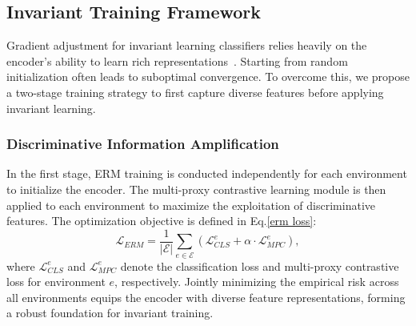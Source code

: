 \subsection{Invariant Training Framework}
\label{invariant training}
Gradient adjustment for invariant learning classifiers relies heavily on the encoder’s ability to learn rich representations~\cite{rich}. Starting from random initialization often leads to suboptimal convergence. To overcome this, we propose a two-stage training strategy to first capture diverse features before applying invariant learning.

\subsubsection{Discriminative Information Amplification}
In the first stage, ERM training is conducted independently for each environment to initialize the encoder. The multi-proxy contrastive learning module is then applied to each environment to maximize the exploitation of discriminative features. The optimization objective is defined in Eq.\ref{erm loss}:
\begin{equation}
\label{erm loss}
\mathcal{L}_{ERM} = \frac{1}{|\mathcal{E}|} \sum_{e \in \mathcal{E}} (\mathcal{L}_{CLS}^e + \alpha \cdot \mathcal{L}_{MPC}^e),
\end{equation}
where $\mathcal{L}_{CLS}^e$ and $\mathcal{L}_{MPC}^e$ denote the classification loss and multi-proxy contrastive loss for environment $e$, respectively. Jointly minimizing the empirical risk across all environments equips the encoder with diverse feature representations, forming a robust foundation for invariant training.


